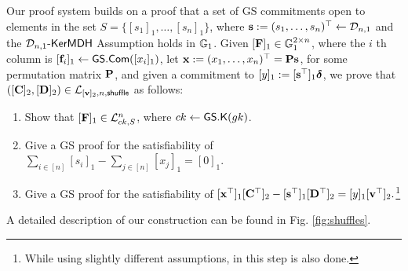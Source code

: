 Our proof system builds on a proof that a set of GS commitments open to elements in the set $S=\{[s_1]_1,\ldots,[s_n]_1\}$, where $\mathbf{s}:=(s_1,\ldots,s_n)^\top\gets\mathcal{D}_{n,1}$ and the $\mathcal{D}_{n,1}\mbox{-}\mathsf{KerMDH}$ Assumption holds in $\mathbb{G}_1$. Given $[\mathbf{{F}}]_1\in\mathbb{G}_1^{2\times n}$, where the $i$ th column is $[\mathbf{f}_i]_1\gets{\mathsf{GS}}.\mathsf{Com}([x_i]_1)$, let $\mathbf{x}:=({x}_1,\ldots,{x}_n)^\top=\mathbf{{P}}\mathbf{s}$, for some permutation matrix $\mathbf{{P}}$, and given a commitment to $[y]_1:=[\mathbf{s}^\top]_1{\boldsymbol \delta}$, we prove that $([\mathbf{{C}}]_2,[\mathbf{{D}}]_2)\in\mathcal{L}_{[\mathbf{v}]_2,n,\mathsf{shuffle}}$ as follows:
\begin{enumerate}[label=\alph*)]
\item Show that $[\mathbf{{F}}]_1\in\mathcal{L}_{ck,S}^n$, where $ck\gets{\mathsf{GS}}.\mathsf{K}({gk})$.\label{shuffle:a}
\item Give a GS proof for the satisfiability of $\sum_{i\in[n]}[s_i]_1-\sum_{j\in[n]}[{x}_j]_1=[0]_1$.\label{shuffle:b}
\item Give a GS proof for the satisfiability of
$
[\mathbf{x}^\top]_1[\mathbf{{C}}^\top]_2-[\mathbf{s}^\top]_1[\mathbf{{D}}^\top]_2=[y]_1[\mathbf{v}^\top]_2.\label{shuffle:c}
$\footnote{While using slightly different assumptions, in \cite{AC:GroLu07} this step is also done.}
\end{enumerate}

A detailed description of our construction can be found in Fig. \ref{fig:shuffles}.

